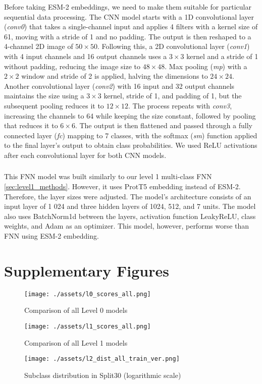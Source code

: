 \documentclass{bioinfo}
\begin{document}
Before taking ESM-2 embeddings, we need to make them suitable for particular sequential data processing.
The CNN model starts with a 1D convolutional layer (\textit{conv0}) that takes a single-channel input and applies 4
filters with a kernel size of 61, moving with a stride of 1 and no padding.
The output is then reshaped to a 4-channel 2D image of  $50\times50$. Following this, a 2D convolutional layer (\textit{conv1}) with 4 input 
channels and 16 output channels uses a $3\times3$ kernel and a stride of 1 without padding, reducing the image size to $48\times48$. 
Max pooling (\textit{mp}) with a $2\times2$ window and stride of 2 is applied, halving the dimensions to $24\times24$. 
Another convolutional layer (\textit{conv2}) with 16 input and 32 output channels maintains the size using a $3\times3$ kernel, 
stride of 1, and padding of 1, but the subsequent pooling reduces it to $12\times12$. 
The process repeats with \textit{conv3}, increasing the channels to 64 while keeping the size constant, 
followed by pooling that reduces it to $6\times6$. The output is then flattened and passed through a fully connected 
layer (\textit{fc}) mapping to 7 classes, with the softmax (\textit{sm}) function applied to the final layer's output to obtain class probabilities. 
We used ReLU activations after each convolutional layer for both CNN models.

\subsubsection{}
This FNN model was built similarly to our level 1 multi-class FNN \ref{sec:level1_methods}. 
However, it uses ProtT5 embedding instead of ESM-2. 
Therefore, the layer sizes were adjusted. The model's architecture consists of an input layer of 1 024 
and three hidden layers of 1024, 512, and 7 units. The model also uses BatchNorm1d between the layers, 
activation function LeakyReLU, class weights, and Adam as an optimizer. This model, however, performs worse than 
FNN using ESM-2 embedding.


\section{Supplementary Figures}\label{sec:supplementary figures}
\begin{figure}[!ht]
	\texttt{[image: ./assets/l0\_scores\_all.png]}
	\caption{Comparison of all Level 0 models}
	\label{fig:l0_comp_all}
\end{figure}

\begin{figure}[!ht]
	\texttt{[image: ./assets/l1\_scores\_all.png]}
	\caption{Comparison of all Level 1 models}
	\label{fig:l1_comp_all}
\end{figure}
\begin{figure}[!ht]
\texttt{[image: ./assets/l2\_dist\_all\_train\_ver.png]}
\caption{Subclass distribution in Split30 (logarithmic scale)}\label{fig:l2_dist_train}
\end{figure}

\newpage
\newpage

 

\end{document}
